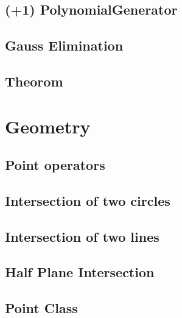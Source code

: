 \documentclass[10pt,twocolumn,oneside]{article}
\begin{document}
\subsection{(+1) PolynomialGenerator}


\subsection{Gauss Elimination}


\subsection{Theorom}


\section{Geometry}
\subsection{Point operators}


\subsection{Intersection of two circles}


\subsection{Intersection of two lines}


\subsection{Half Plane Intersection}


\subsection{Point Class}

\end{document}
